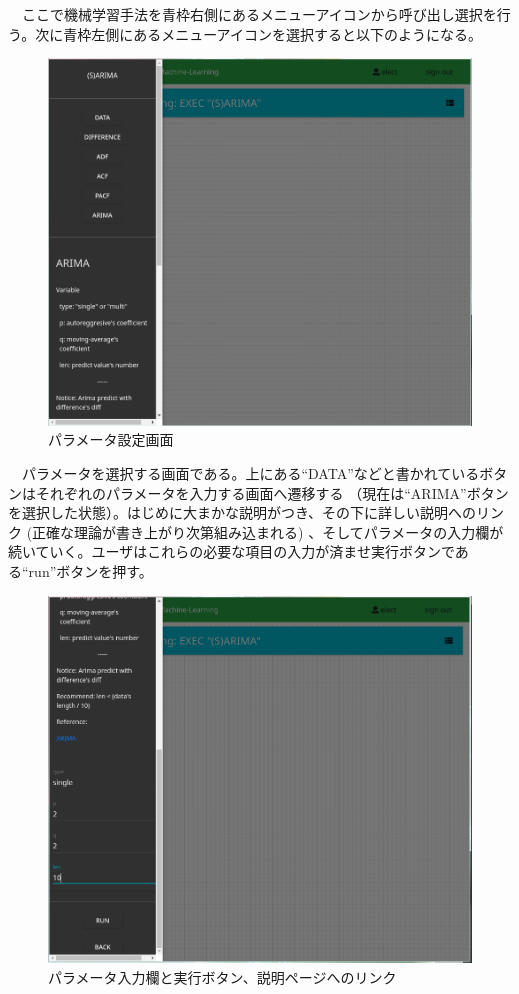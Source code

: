 \documentclass{scrartcl}
\begin{document}
　ここで機械学習手法を青枠右側にあるメニューアイコンから呼び出し選択を行う。次に青枠左側にあるメニューアイコンを選択すると以下のようになる。\\

\begin{figure}[htbp]
\centering
\includegraphics[width=12cm]{./settings-view.PNG}
\caption{パラメータ設定画面}
\end{figure}
\newpage
　パラメータを選択する画面である。上にある``DATA''などと書かれているボタンはそれぞれのパラメータを入力する画面へ遷移する （現在は``ARIMA''ボタンを選択した状態）。はじめに大まかな説明がつき、その下に詳しい説明へのリンク (正確な理論が書き上がり次第組み込まれる) 、そしてパラメータの入力欄が続いていく。ユーザはこれらの必要な項目の入力が済ませ実行ボタンである``run''ボタンを押す。\\

\begin{figure}[htbp]
\centering
\includegraphics[width=.9\linewidth]{./settings-view2.PNG}
\caption{パラメータ入力欄と実行ボタン、説明ページへのリンク}
\end{figure}
\end{document}
